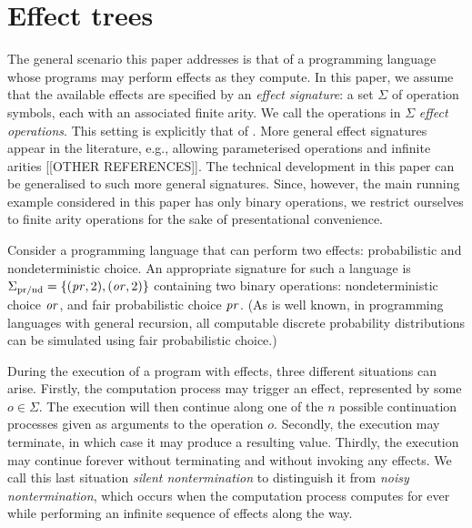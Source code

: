 \section{Effect trees}
\label{section:trees}

The general scenario this paper addresses is that of a programming language whose programs may perform effects as they compute. In this paper, we assume that the available effects are  specified 
by  an \emph{effect signature}: a set $\Sigma$ of operation symbols, each with an associated finite arity. We call the operations in $\Sigma$ \emph{effect operations}. This setting is explicitly that of \cite{plotkin2001adequacy}.
More general effect signatures appear in the literature, e.g., allowing parameterised operations and infinite arities
\cite{gom}  [[OTHER REFERENCES]]. The technical development in this paper can be generalised to such
more general signatures. Since, however, the main running example considered in this paper has only binary operations, we restrict ourselves to finite arity operations 
for the sake of presentational convenience. %
\begin{example}
\label{example:prnd}
    Consider a programming language that can perform two effects: probabilistic and nondeterministic choice.
    An appropriate signature for such a language is 
    $\Sigma_{\text{pr/nd}} = \{ (\operatorname{\mathit{pr}},2), (\operatorname{\mathit{or}},2) \}$ containing two binary operations:
    nondeterministic choice $\operatorname{\mathit{or}}$, 
    and fair probabilistic choice $\operatorname{\mathit{pr}}$. (As is well known, in programming languages with general recursion, all computable discrete probability distributions can be 
     simulated using fair probabilistic choice.)
 \end{example}

During the execution of a program with effects, three different situations can arise. Firstly, the computation process may
trigger an effect, represented by some $o \in \Sigma$. The execution will then continue along one of the $n$ possible continuation processes given as arguments to the operation $o$. Secondly, the execution may terminate, 
in which case it may produce a resulting value. 
Thirdly, the execution may continue forever without terminating and without invoking any effects. We call this last situation
 \emph{silent nontermination} to distinguish it from \emph{noisy nontermination}, which occurs
 when the computation process computes for ever while performing an infinite sequence of effects along the way.

